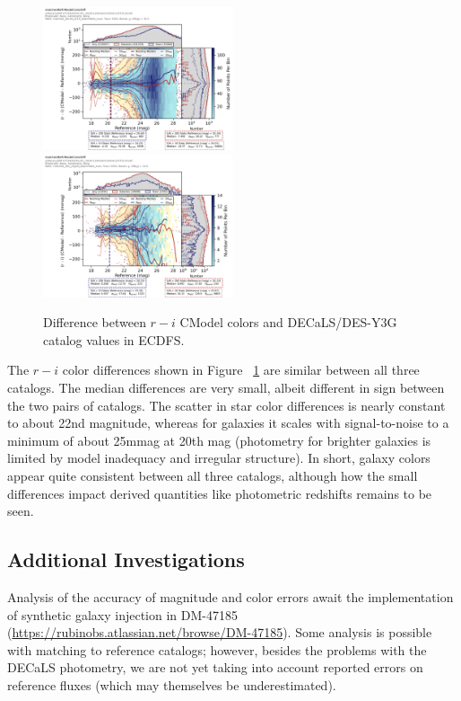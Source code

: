 \begin{figure}
  \label{fig:cdfs_rmi_vs_des}
  \includegraphics[width=0.5\textwidth]{galaxy_photometry/cdfs_g_vs_rmi_DECaLS.png}
  \includegraphics[width=0.5\textwidth]{galaxy_photometry/cdfs_g_vs_rmi_desy3g.png}
\caption{Difference between $r-i$ CModel colors and DECaLS/DES-Y3G catalog values in ECDFS.}
\end{figure}

The $r-i$ color differences shown in Figure ~\ref{fig:cdfs_rmi_vs_des} are similar between all three catalogs.
The median differences are very small, albeit different in sign between the two pairs of catalogs.
The scatter in star color differences is nearly constant to about 22nd magnitude, whereas for galaxies it scales with signal-to-noise to a minimum of about 25mmag at 20th mag (photometry for brighter galaxies is limited by model inadequacy and irregular structure).
In short, galaxy colors appear quite consistent between all three catalogs, although how the small differences impact derived quantities like photometric redshifts remains to be seen.

\subsection{Additional Investigations}
\label{subsec:galaxy_photometry_additional}

Analysis of the accuracy of magnitude and color errors await the implementation of synthetic galaxy injection in DM-47185 (\url{https://rubinobs.atlassian.net/browse/DM-47185}).
Some analysis is possible with matching to reference catalogs; however, besides the problems with the DECaLS photometry, we are not yet taking into account reported errors on reference fluxes (which may themselves be underestimated).


